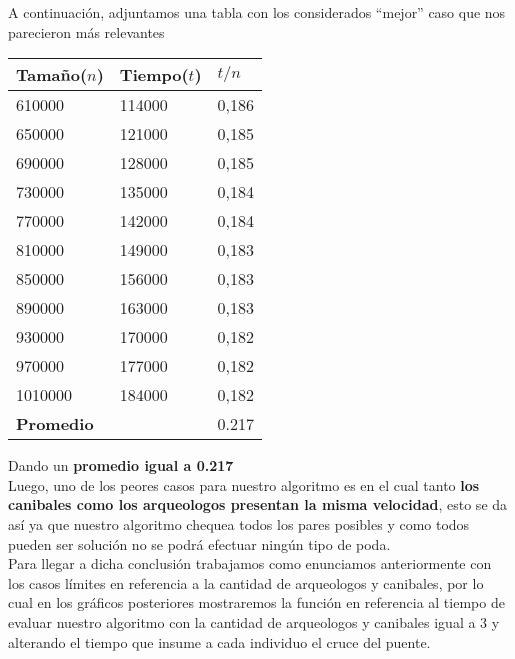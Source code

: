 A continuaci\'on, adjuntamos una tabla con los considerados “mejor” caso que nos parecieron m\'as relevantes

\begin{table}[H]

    \begin{tabular}{ | l | l |l |}
    \hline
		Tamaño($n$) & Tiempo($t$) & \textbf{$t /n$}  \\ \hline
610000 & 114000 & 0,186 \\ \hline
650000 & 121000 & 0,185 \\ \hline
690000 & 128000 & 0,185 \\ \hline
730000 & 135000 & 0,184 \\ \hline
770000 & 142000 & 0,184 \\ \hline
810000 & 149000 & 0,183 \\ \hline
850000 & 156000 & 0,183 \\ \hline
890000 & 163000 & 0,183 \\ \hline
930000 & 170000 & 0,182 \\ \hline
970000 & 177000 & 0,182 \\ \hline
1010000 & 184000 & 0,182 \\ \hline

\textbf{Promedio} & & 0.217 \\ \hline

    \end{tabular}
\end{table}

Dando un \textbf{promedio igual a 0.217 }\\

Luego, uno de los peores casos para nuestro algoritmo es en el cual tanto \textbf{los canibales como los arqueologos presentan la misma velocidad}, esto se da as\'i ya que nuestro algoritmo chequea todos los pares posibles y como todos pueden ser soluci\'on no se podr\'a efectuar ning\'un tipo de poda.\\

Para llegar a dicha conclusi\'on trabajamos como enunciamos anteriormente con los casos l\'imites en referencia a la cantidad de arqueologos y canibales, por lo cual en los gr\'aficos posteriores mostraremos la funci\'on en referencia al tiempo de evaluar nuestro algoritmo con la cantidad de arqueologos y canibales igual a 3 y alterando el tiempo que insume a cada individuo el cruce del puente.\\

\vspace*{0.3cm} \vspace*{0.3cm}
  \begin{center}
  \end{center}
  \vspace*{0.3cm}

